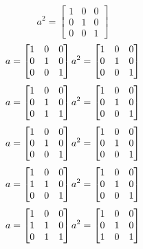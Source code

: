 \begin{mdframed}[style=darkAnswer,frametitle={Joe Starr}]
\begin{itemize}
{$$    a^{ 2 }={ \begin{bmatrix}1&0&0\\0&1&0\\0&0&1\end{bmatrix} }
    $$
    $$a= \begin{bmatrix}1&0&0\\0&1&0\\0&0&1\end{bmatrix} \\
    a^{ 2 }={ \begin{bmatrix}1&0&0\\0&1&0\\0&0&1\end{bmatrix} }
    $$
    $$a= \begin{bmatrix}1&0&0\\0&1&0\\0&1&1\end{bmatrix} \\
    a^{ 2 }={ \begin{bmatrix}1&0&0\\0&1&0\\0&0&1\end{bmatrix} }
    $$
    $$a= \begin{bmatrix}1&0&0\\0&1&0\\0&0&1\end{bmatrix} \\
    a^{ 2 }={ \begin{bmatrix}1&0&0\\0&1&0\\0&0&1\end{bmatrix} }
    $$
    $$a= \begin{bmatrix}1&0&0\\1&1&0\\0&0&1\end{bmatrix} \\
    a^{ 2 }={ \begin{bmatrix}1&0&0\\0&1&0\\0&0&1\end{bmatrix} }
    $$
    $$a= \begin{bmatrix}1&0&0\\1&1&0\\0&1&1\end{bmatrix} \\
    a^{ 2 }={ \begin{bmatrix}1&0&0\\0&1&0\\1&0&1\end{bmatrix} }
$$}
\end{itemize}
\end{mdframed}
